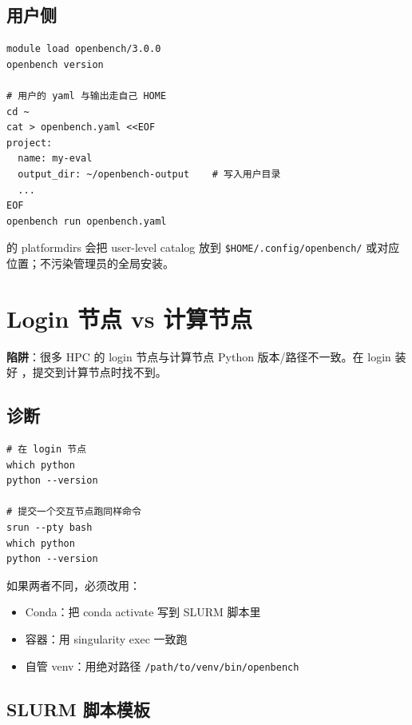 \subsection{用户侧}

\begin{verbatim}
module load openbench/3.0.0
openbench version

# 用户的 yaml 与输出走自己 HOME
cd ~
cat > openbench.yaml <<EOF
project:
  name: my-eval
  output_dir: ~/openbench-output    # 写入用户目录
  ...
EOF
openbench run openbench.yaml
\end{verbatim}

\openbench{} 的 platformdirs 会把 user-level catalog 放到 \texttt{\$HOME/.config/openbench/} 或对应位置；不污染管理员的全局安装。


\section{Login 节点 vs 计算节点}

\textbf{陷阱}：很多 HPC 的 login 节点与计算节点 Python 版本/路径不一致。在 login 装好 \openbench{}，提交到计算节点时找不到。

\subsection{诊断}

\begin{verbatim}
# 在 login 节点
which python
python --version

# 提交一个交互节点跑同样命令
srun --pty bash
which python
python --version
\end{verbatim}

如果两者不同，必须改用：

\begin{itemize}
  \item Conda：把 conda activate 写到 SLURM 脚本里
  \item 容器：用 singularity exec 一致跑
  \item 自管 venv：用绝对路径 \texttt{/path/to/venv/bin/openbench}
\end{itemize}

\subsection{SLURM 脚本模板}

